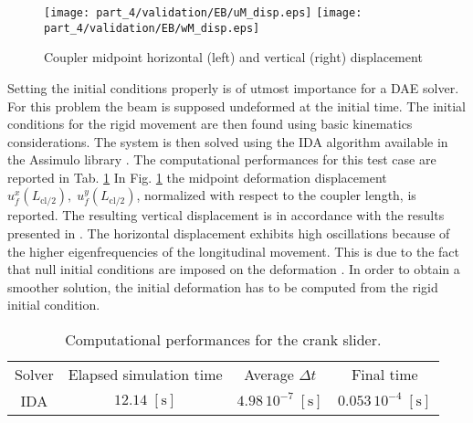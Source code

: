 \begin{figure}[tb]
	\centering
	\texttt{[image: part\_4/validation/EB/uM\_disp.eps]} 
	\texttt{[image: part\_4/validation/EB/wM\_disp.eps]} 
	\caption{Coupler midpoint horizontal (left) and vertical (right) displacement}
	\label{fig:defM_crsl}
\end{figure}

Setting the initial conditions properly is of utmost  importance for a DAE solver. For this problem the beam is supposed undeformed at the initial time. The initial conditions for the rigid movement are then found using basic kinematics considerations.  The system is then solved using the IDA algorithm available in the Assimulo library \cite{assimulo2015}. The computational performances for this test case are reported in Tab. \ref{tab:comp_perf_crslider} In Fig. \ref{fig:defM_crsl} the midpoint deformation displacement $u_f^x(L_{\text{cl}/2}),\; u_f^y(L_{\text{cl}/2})$, normalized with respect to the coupler length, is reported. The resulting vertical displacement is in accordance with the results presented in \cite{ellenbroek2018}. The horizontal displacement exhibits high oscillations because of the higher eigenfrequencies of the longitudinal movement. This is due to the fact that null initial conditions are imposed on the deformation \cite{simeon2006}. In order to obtain a smoother solution, the initial deformation has to be computed from the rigid initial condition.


\begin{table}[tb]
	\centering
	\caption{{Computational performances for the crank slider.}}
	\label{tab:comp_perf_crslider}       %
	\begin{tabular}{cccc}
		\hline\noalign{\smallskip}
		Solver & Elapsed simulation time & Average $\Delta t$ & Final time \\
		\noalign{\smallskip}\hline\noalign{\smallskip}
		IDA & $12.14\; \mathrm{[s]}$ & $4.98 \, 10^{-7} \; \mathrm{[s]}$ & $0.053 \, 10^{-4} \; \mathrm{[s]}$\\
		\hline
	\end{tabular}
\end{table}

